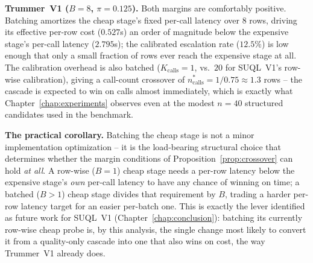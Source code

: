 \textbf{Trummer~V1 ($B=8$, $\pi=0.125$).} Both margins are comfortably
positive. Batching amortizes the cheap stage's fixed per-call latency
over $8$ rows, driving its effective per-row cost ($0.527$s) an order of
magnitude below the expensive stage's per-call latency ($2.795$s); the
calibrated escalation rate ($12.5\%$) is low enough that only a small
fraction of rows ever reach the expensive stage at all. The calibration
overhead is also batched ($K_{\mathrm{calls}}=1$, vs.\ $20$ for SUQL~V1's
row-wise calibration), giving a call-count crossover of
$n^\ast_{\mathrm{calls}} = 1/0.75 \approx 1.3$ rows -- the cascade is
expected to win on calls almost immediately, which is exactly what
Chapter~\ref{chap:experiments} observes even at the modest $n=40$
structured candidates used in the benchmark.

\textbf{The practical corollary.} Batching the cheap stage is not a
minor implementation optimization -- it is the load-bearing structural
choice that determines whether the margin conditions of
Proposition~\ref{prop:crossover} can hold \emph{at all}. A row-wise
($B=1$) cheap stage needs a per-row latency below the expensive stage's
\emph{own} per-call latency to have any chance of winning on time; a
batched ($B>1$) cheap stage divides that requirement by $B$, trading a
harder per-row latency target for an easier per-batch one. This is
exactly the lever identified as future work for SUQL~V1
(Chapter~\ref{chap:conclusion}): batching its currently row-wise cheap
probe is, by this analysis, the single change most likely to convert it
from a quality-only cascade into one that also wins on cost, the way
Trummer~V1 already does.
